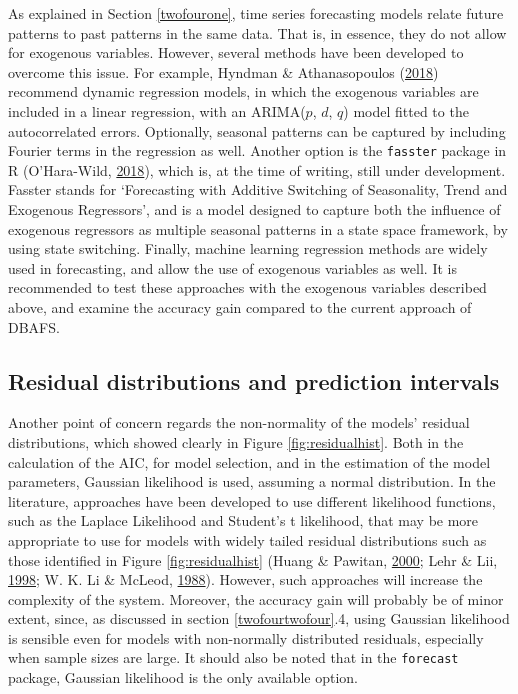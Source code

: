 \documentclass[12pt,oneside]{reedthesis}
\begin{document}
As explained in Section \ref{twofourone}, time series forecasting models
relate future patterns to past patterns in the same data. That is, in
essence, they do not allow for exogenous variables. However, several
methods have been developed to overcome this issue. For example, Hyndman
\& Athanasopoulos (\protect\hyperlink{ref-hyndman2018fpp}{2018})
recommend dynamic regression models, in which the exogenous variables
are included in a linear regression, with an ARIMA(\(p\), \(d\), \(q\))
model fitted to the autocorrelated errors. Optionally, seasonal patterns
can be captured by including Fourier terms in the regression as well.
Another option is the \texttt{fasster} package in R (O'Hara-Wild,
\protect\hyperlink{ref-fasster}{2018}), which is, at the time of
writing, still under development. Fasster stands for `Forecasting with
Additive Switching of Seasonality, Trend and Exogenous Regressors', and
is a model designed to capture both the influence of exogenous
regressors as multiple seasonal patterns in a state space framework, by
using state switching. Finally, machine learning regression methods are
widely used in forecasting, and allow the use of exogenous variables as
well. It is recommended to test these approaches with the exogenous
variables described above, and examine the accuracy gain compared to the
current approach of DBAFS.

\subsection{Residual distributions and prediction
intervals}\label{residual-distributions-and-prediction-intervals}

Another point of concern regards the non-normality of the models'
residual distributions, which showed clearly in Figure
\ref{fig:residualhist}. Both in the calculation of the AIC, for model
selection, and in the estimation of the model parameters, Gaussian
likelihood is used, assuming a normal distribution. In the literature,
approaches have been developed to use different likelihood functions,
such as the Laplace Likelihood and Student's t likelihood, that may be
more appropriate to use for models with widely tailed residual
distributions such as those identified in Figure \ref{fig:residualhist}
(Huang \& Pawitan, \protect\hyperlink{ref-huang2000}{2000}; Lehr \& Lii,
\protect\hyperlink{ref-lehr1998}{1998}; W. K. Li \& McLeod,
\protect\hyperlink{ref-li1988}{1988}). However, such approaches will
increase the complexity of the system. Moreover, the accuracy gain will
probably be of minor extent, since, as discussed in section
\ref{twofourtwofour}.4, using Gaussian likelihood is sensible even for
models with non-normally distributed residuals, especially when sample
sizes are large. It should also be noted that in the \texttt{forecast}
package, Gaussian likelihood is the only available option.
\end{document}

